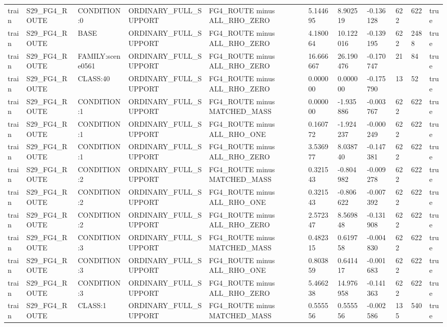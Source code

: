 \begin{tabular}{lllllllllll}
train & S29\_FG4\_ROUTE & CONDITION:0 & ORDINARY\_FULL\_SUPPORT & FG4\_ROUTE minus ALL\_RHO\_ZERO & 5.144695 & 8.902519 & -0.136128 & 622 & 622 & true \\
train & S29\_FG4\_ROUTE & BASE & ORDINARY\_FULL\_SUPPORT & FG4\_ROUTE minus ALL\_RHO\_ZERO & 4.180064 & 10.122016 & -0.139195 & 622 & 2488 & true \\
train & S29\_FG4\_ROUTE & FAMILY:scene0561 & ORDINARY\_FULL\_SUPPORT & FG4\_ROUTE minus ALL\_RHO\_ZERO & 16.666667 & 26.190476 & -0.170747 & 21 & 84 & true \\
train & S29\_FG4\_ROUTE & CLASS:40 & ORDINARY\_FULL\_SUPPORT & FG4\_ROUTE minus ALL\_RHO\_ZERO & 0.000000 & 0.000000 & -0.175790 & 13 & 52 & true \\
train & S29\_FG4\_ROUTE & CONDITION:1 & ORDINARY\_FULL\_SUPPORT & FG4\_ROUTE minus MATCHED\_MASS & 0.000000 & -1.935886 & -0.003767 & 622 & 622 & true \\
train & S29\_FG4\_ROUTE & CONDITION:1 & ORDINARY\_FULL\_SUPPORT & FG4\_ROUTE minus ALL\_RHO\_ONE & 0.160772 & -1.924237 & -0.000249 & 622 & 622 & true \\
train & S29\_FG4\_ROUTE & CONDITION:1 & ORDINARY\_FULL\_SUPPORT & FG4\_ROUTE minus ALL\_RHO\_ZERO & 3.536977 & 8.038740 & -0.147381 & 622 & 622 & true \\
train & S29\_FG4\_ROUTE & CONDITION:2 & ORDINARY\_FULL\_SUPPORT & FG4\_ROUTE minus MATCHED\_MASS & 0.321543 & -0.804982 & -0.009278 & 622 & 622 & true \\
train & S29\_FG4\_ROUTE & CONDITION:2 & ORDINARY\_FULL\_SUPPORT & FG4\_ROUTE minus ALL\_RHO\_ONE & 0.321543 & -0.806622 & -0.007392 & 622 & 622 & true \\
train & S29\_FG4\_ROUTE & CONDITION:2 & ORDINARY\_FULL\_SUPPORT & FG4\_ROUTE minus ALL\_RHO\_ZERO & 2.572347 & 8.569848 & -0.131908 & 622 & 622 & true \\
train & S29\_FG4\_ROUTE & CONDITION:3 & ORDINARY\_FULL\_SUPPORT & FG4\_ROUTE minus MATCHED\_MASS & 0.482315 & 0.619758 & -0.004830 & 622 & 622 & true \\
train & S29\_FG4\_ROUTE & CONDITION:3 & ORDINARY\_FULL\_SUPPORT & FG4\_ROUTE minus ALL\_RHO\_ONE & 0.803859 & 0.641417 & -0.001683 & 622 & 622 & true \\
train & S29\_FG4\_ROUTE & CONDITION:3 & ORDINARY\_FULL\_SUPPORT & FG4\_ROUTE minus ALL\_RHO\_ZERO & 5.466238 & 14.976958 & -0.141363 & 622 & 622 & true \\
train & S29\_FG4\_ROUTE & CLASS:1 & ORDINARY\_FULL\_SUPPORT & FG4\_ROUTE minus MATCHED\_MASS & 0.555556 & 0.555556 & -0.002586 & 135 & 540 & true \\

\end{tabular}
